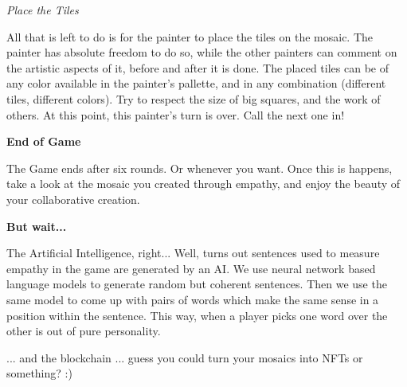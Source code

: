 \documentclass[twocolumn]{article}
\newcommand{\lvl}[1]{\vspace{0.5cm}\Large{\textbf{#1}}\vspace{0.2cm}}
\newcommand{\sublvl}[1]{\vspace{0.3cm}\large{\textit{#1}}\vspace{0.1cm}}
\begin{document}
\sublvl{Place the Tiles}

All that is left to do is for the painter to place the tiles on the mosaic. The painter has absolute freedom to do so, while the other painters can comment on the artistic aspects of it, before and after it is done. The placed tiles can be of any color available in the painter's pallette, and in any combination (different tiles, different colors). Try to respect the size of big squares, and the work of others.
% 
% 
% 
% 
At this point, this painter's turn is over. Call the next one in!

\lvl{End of Game}

The Game ends after six rounds. Or whenever you want. Once this is happens, take a look at the mosaic you created through empathy, and enjoy the beauty of your collaborative creation.



\lvl{But wait...}

The Artificial Intelligence, right... Well, turns out sentences used to measure empathy in the game are generated by an AI. We use neural network based language models to generate random but coherent sentences. Then we use the same model to come up with pairs of words which make the same sense in a position within the sentence. This way, when a player picks one word over the other is out of pure personality.

... and the blockchain ... guess you could turn your mosaics into NFTs or something? :)
% 
% 
\end{document}
